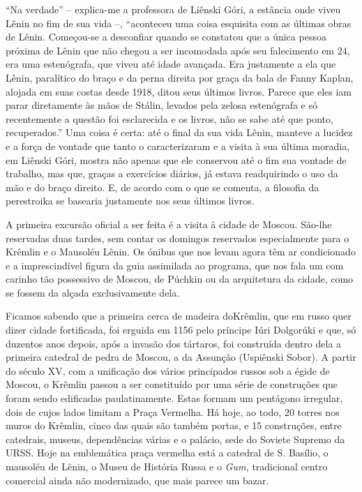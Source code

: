 ``Na verdade'' -- explica-me a professora de Liênski Góri, a estância
onde viveu Lênin no fim de sua vida --, ``aconteceu uma coisa esquisita
com as últimas obras de Lênin. Começou-se a desconfiar quando se
constatou que a única pessoa próxima de Lênin que não chegou a ser
incomodada após seu falecimento em 24, era uma estenógrafa, que viveu
até idade avançada. Era justamente a ela que Lênin, paralítico do braço
e da perna direita por graça da bala de Fanny Kaplan, alojada em suas
costas desde 1918, ditou seus últimos livros. Parece que eles iam parar
diretamente às mãos de Stálin, levados pela zelosa estenógrafa e só
recentemente a questão foi esclarecida e os livros, não se sabe até que
ponto, recuperados.'' Uma coisa é certa: até o final da sua vida Lênin,
manteve a lucidez e a força de vontade que tanto o caracterizaram e a
visita à sua última moradia, em Liênski Góri, mostra não apenas que ele
conservou até o fim sua vontade de trabalho, mas que, graças a
exercícios diários, já estava readquirindo o uso da mão e do braço
direito. E, de acordo com o que se comenta, a filosofia da perestroika
se basearia justamente nos seus últimos livros.

A primeira excursão oficial a ser feita é a visita à cidade de Moscou.
São-lhe reservadas duas tardes, sem contar os domingos reservados
especialmente para o Krêmlin e o Mausoléu Lênin. Os ónibus que nos levam
agora têm ar condicionado e a imprescindível figura da guia assimilada
ao programa, que nos fala um com carinho tão possessivo de Moscou, de
Púchkin ou da arquitetura da cidade, como se fossem da alçada
exclusivamente dela.

Ficamos sabendo que a primeira cerca de madeira doKrêmlin, que em russo
quer dizer cidade fortificada, foi erguida em 1156 pelo príncipe Iúri
Dolgorúki e que, só duzentos anos depois, após a invasão dos tártaros,
foi construída dentro dela a primeira catedral de pedra de Moscou, a da
Assunção (Uspiênski Sobor). A partir do século XV, com a unificação dos
vários principados russos sob a égide de Moscou, o Krêmlin passou a ser
constituído por uma série de construções que foram sendo edificadas
paulatinamente. Estas formam um pentágono irregular, dois de cujos lados
limitam a Praça Vermelha. Há hoje, ao todo, 20 torres nos muros do
Krêmlin, cinco das quais são também portas, e 15 construções, entre
catedrais, museus, dependências várias e o palácio, sede do Soviete
Supremo da URSS. Hoje na emblemática praça vermelha está a catedral de
S. Basílio, o mausoléu de Lênin, o Museu de História Russa e o
\emph{Gum,} tradicional centro comercial ainda não modernizado, que mais
parece um bazar.

